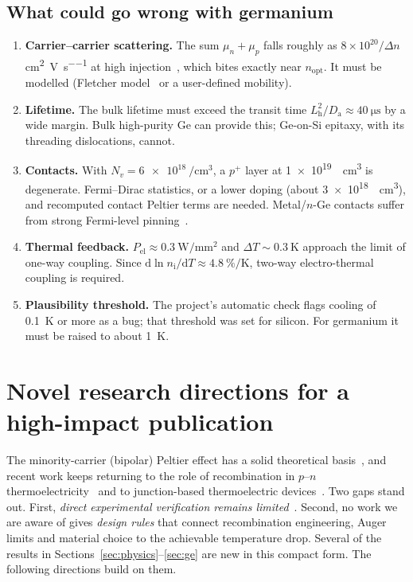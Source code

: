 \documentclass[11pt,a4paper]{article}
\newcommand{\Da}{D_{\mathrm{a}}}
\newcommand{\Lh}{L_{\mathrm{h}}}
\newcommand{\nI}{n_{\mathrm{i}}}
\newcommand{\dd}{\mathrm{d}}
\begin{document}
\subsection{What could go wrong with germanium}
\begin{caveat}
\begin{enumerate}
  \item \textbf{Carrier--carrier scattering.} The sum $\mu_n+\mu_p$ falls roughly as $8\times10^{20}/\Delta n$\,\si{\centi\metre\squared\per\volt\per\second} at high injection~\cite{garin2026}, which bites exactly near $n_{\mathrm{opt}}$. It must be modelled (Fletcher model~\cite{fletcher} or a user-defined mobility).
  \item \textbf{Lifetime.} The bulk lifetime must exceed the transit time $\Lh^2/\Da\approx\SI{40}{\micro\second}$ by a wide margin. Bulk high-purity Ge can provide this; Ge-on-Si epitaxy, with its threading dislocations, cannot.
  \item \textbf{Contacts.} With $N_v=\SI{6e18}{\per\centi\metre\cubed}$, a $p^+$ layer at \SI{1e19}{\per\centi\metre\cubed} is degenerate. Fermi--Dirac statistics, or a lower doping (about \SI{3e18}{\per\centi\metre\cubed}), and recomputed contact Peltier terms are needed. Metal/$n$-Ge contacts suffer from strong Fermi-level pinning~\cite{dimoulas}.
  \item \textbf{Thermal feedback.} $P_{\mathrm{el}}\approx\SI{0.3}{\watt\per\milli\metre\squared}$ and $\Delta T\sim\SI{0.3}{\kelvin}$ approach the limit of one-way coupling. Since $\dd\ln\nI/\dd T\approx\SI{4.8}{\percent\per\kelvin}$, two-way electro-thermal coupling is required.
  \item \textbf{Plausibility threshold.} The project's automatic check flags cooling of \SI{0.1}{\kelvin} or more as a bug; that threshold was set for silicon. For germanium it must be raised to about \SI{1}{\kelvin}.
\end{enumerate}
\end{caveat}

\section{Novel research directions for a high-impact publication}\label{sec:novel}
The minority-carrier (bipolar) Peltier effect has a solid theoretical basis~\cite{pipe2002,wachutka}, and recent work keeps returning to the role of recombination in $p$--$n$ thermoelectricity~\cite{petrov2025} and to junction-based thermoelectric devices~\cite{tang2025}. Two gaps stand out. First, \emph{direct experimental verification remains limited}~\cite{pipe2002}. Second, no work we are aware of gives \emph{design rules} that connect recombination engineering, Auger limits and material choice to the achievable temperature drop. Several of the results in Sections~\ref{sec:physics}--\ref{sec:ge} are new in this compact form. The following directions build on them.
\end{document}
